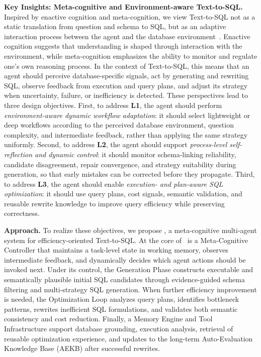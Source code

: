 \textbf{Key Insights: Meta-cognitive and Environment-aware Text-to-SQL.}
Inspired by enactive cognition and meta-cognition, we view Text-to-SQL not as a static translation from question and schema to SQL, but as an adaptive interaction process between the agent and the database environment~\cite{varela1991embodied,flavell1979metacognition}.
Enactive cognition suggests that understanding is shaped through interaction with the environment, while meta-cognition emphasizes the ability to monitor and regulate one's own reasoning process.
In the context of Text-to-SQL, this means that an agent should perceive database-specific signals, act by generating and rewriting SQL, observe feedback from execution and query plans, and adjust its strategy when uncertainty, failure, or inefficiency is detected.
These perspectives lead to three design objectives.
First, to address \textbf{L1}, the agent should perform \emph{environment-aware dynamic workflow adaptation}: it should select lightweight or deep workflows according to the perceived database environment, question complexity, and intermediate feedback, rather than applying the same strategy uniformly.
Second, to address \textbf{L2}, the agent should support \emph{process-level self-reflection and dynamic control}: it should monitor schema-linking reliability, candidate disagreement, repair convergence, and strategy suitability during generation, so that early mistakes can be corrected before they propagate.
Third, to address \textbf{L3}, the agent should enable \emph{execution- and plan-aware SQL optimization}: it should use query plans, cost signals, semantic validation, and reusable rewrite knowledge to improve query efficiency while preserving correctness.

\textbf{Approach.} 
To realize these objectives, we propose \toolname, a meta-cognitive multi-agent system for efficiency-oriented Text-to-SQL.
At the core of \toolname\ is a Meta-Cognitive Controller that maintains a task-level state in working memory, observes intermediate feedback, and dynamically decides which agent actions should be invoked next.
Under its control, the Generation Phase constructs executable and semantically plausible initial SQL candidates through evidence-guided schema filtering and multi-strategy SQL generation.
When further efficiency improvement is needed, the Optimization Loop analyzes query plans, identifies bottleneck patterns, rewrites inefficient SQL formulations, and validates both semantic consistency and cost reduction.
Finally, a Memory Engine and Tool Infrastructure support database grounding, execution analysis, retrieval of reusable optimization experience, and updates to the long-term Auto-Evaluation Knowledge Base (AEKB) after successful rewrites.


